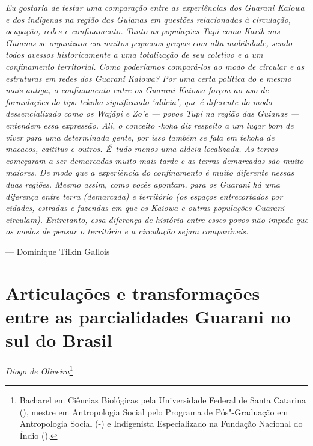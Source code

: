 \begin{flushleft}
\begin{minipage}[c]{0.85\textwidth}
\raggedright
\footnotesize
\emph{Eu gostaria de testar uma comparação entre as experiências dos Guarani
Kaiowa e dos indígenas na região das Guianas em questões relacionadas à
circulação, ocupação, redes e confinamento. Tanto as populações Tupi
como Karib nas Guianas se organizam em muitos pequenos grupos com alta
mobilidade, sendo todos avessos historicamente a uma totalização de seu
coletivo e a um confinamento territorial. Como poderíamos compará-los
ao modo de circular e as estruturas em redes dos Guarani Kaiowa? Por
uma certa política do  e mesmo mais antiga, o confinamento entre os
Guarani Kaiowa forçou ao uso de formulações do tipo \emph{tekoha} significando
‘aldeia’, que é diferente do modo dessencializado como os Wajãpi e Zo’e
--- povos Tupi na região das Guianas --- entendem essa expressão. Ali, o
conceito -\emph{koha} diz respeito a um lugar bom de viver para uma
determinada gente, por isso também se fala em \emph{tekoha} de macacos,
caititus e outros. É~tudo menos uma aldeia localizada. As terras
começaram a ser demarcadas muito mais tarde e as terras demarcadas são
muito maiores. De modo que a experiência do confinamento é muito
diferente nessas duas regiões. Mesmo assim, como vocês apontam, para os
Guarani há uma diferença entre terra (demarcada) e território (os
espaços entrecortados por cidades, estradas e fazendas em que os Kaiowa
e outras populações Guarani circulam). Entretanto, essa diferença de
história entre esses povos não impede que os modos de pensar o
território e a circulação sejam comparáveis.}

\smallskip
\hspace*{\fill}--- Dominique Tilkin Gallois
\end{minipage}
\end{flushleft}

\chapter{Articulações e transformações entre as parcialidades Guarani no sul do
Brasil}
\begin{flushright}
\emph{Diogo de Oliveira}\footnote{Bacharel em Ciências Biológicas pela Universidade Federal de Santa Catarina (),
mestre em Antropologia Social pelo Programa de Pós"-Graduação em Antropologia Social (-) e Indigenista
Especializado na Fundação Nacional do Índio ().}
\end{flushright}

